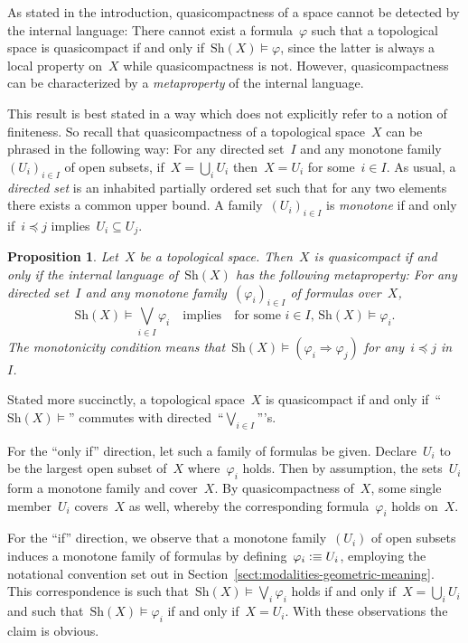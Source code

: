 \documentclass[10pt,reqno,a4paper]{amsbook}
\makeatletter
\theoremstyle{definition}
\theoremstyle{plain}
\newtheorem{prop}[defn]{Proposition}
\theoremstyle{remark}
\newcommand{\Sh}{\mathrm{Sh}}
\newcommand{\?}{\,{:}\,}
\renewcommand{\_}{\mathpunct{.}\,}
\newcommand{\defequiv}{\vcentcolon\equiv}
\renewenvironment{proof}[1][\proofname]{\par
  \pushQED{\qed}%
  \normalfont \topsep6\p@\@plus6\p@\relax
  \trivlist
  \item[\hskip\labelsep
        \itshape
    #1\@addpunct{.}]\ignorespaces
}{%
  \popQED\endtrivlist\@endpefalse
}
\makeatother
\begin{document}
As stated in the introduction, quasicompactness of a space cannot be detected
by the internal language: There cannot exist a formula~$\varphi$ such that a
topological space is quasicompact if and only if~$\Sh(X) \models \varphi$,
since the latter is always a local property on~$X$ while quasicompactness is not.
However, quasicompactness can be characterized by a \emph{metaproperty} of the
internal language.

This result is best stated in a way which does not explicitly refer to a notion
of finiteness. So recall that quasicompactness of a topological space~$X$ can
be phrased in the following way: For any directed set~$I$ and any monotone
family~$(U_i)_{i \in I}$ of open subsets, if~$X = \bigcup_i U_i$ then~$X = U_i$
for some~$i \in I$. As usual, a \emph{directed set} is an inhabited partially
ordered set such that for any two elements there exists a common upper bound.
A family~$(U_i)_{i \in I}$ is \emph{monotone} if and only if~$i \preceq j$
implies~$U_i \subseteq U_j$.

\begin{prop}\label{prop:quasicompact-meta}
Let~$X$ be a topological space. Then~$X$ is quasicompact if and
only if the internal language of~$\Sh(X)$ has the following metaproperty:
For any directed set~$I$ and any monotone family~$(\varphi_i)_{i \in I}$ of
formulas over~$X$,
\[ \Sh(X) \models \bigvee_{i \in I} \varphi_i
  \quad\text{implies}\quad
  \text{for some~$i \in I$, $\Sh(X) \models \varphi_i$}. \]
The monotonicity condition means that~$\Sh(X) \models (\varphi_i \Rightarrow
\varphi_j)$ for any~$i \preceq j$ in~$I$.
\end{prop}

Stated more succinctly, a topological space~$X$ is quasicompact if and only
if~``$\Sh(X) \models$'' commutes with directed~``$\bigvee_{i \in I}$'''s.

\begin{proof}For the ``only if'' direction, let such a family of formulas be
given. Declare~$U_i$ to be the largest open subset of~$X$ where~$\varphi_i$
holds. Then by assumption, the sets~$U_i$ form a monotone family and cover~$X$. By
quasicompactness of~$X$, some single member~$U_i$ covers~$X$ as well, whereby the
corresponding formula~$\varphi_i$ holds on~$X$.

For the ``if'' direction, we observe that a monotone family~$(U_i)$ of open subsets
induces a monotone family of formulas by defining~$\varphi_i \defequiv U_i$,
employing the notational convention set out in
Section~\ref{sect:modalities-geometric-meaning}. This
correspondence is such that~$\Sh(X) \models \bigvee_i \varphi_i$ holds if and
only if~$X = \bigcup_i U_i$ and such that~$\Sh(X) \models \varphi_i$ if and
only if~$X = U_i$. With these observations the claim is obvious.
\end{proof}
\end{document}
